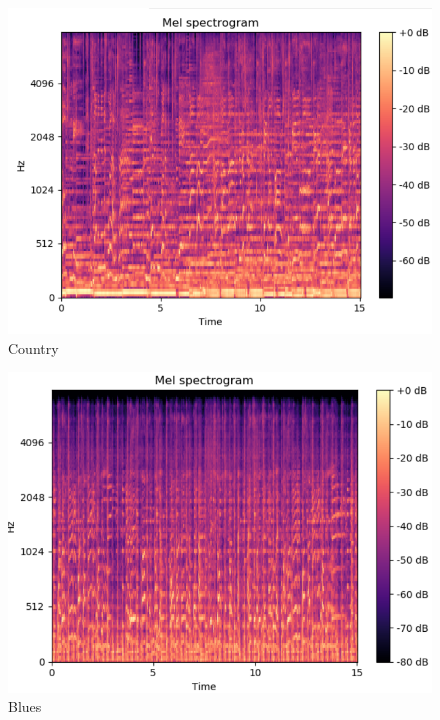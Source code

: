 \begin{figure}
\begin{center}
\includegraphics[scale=0.2]{./figures/country.png}
\end{center}
\caption
{
Country
}
\label{fig:big_picture4}
\end{figure}

\begin{figure}
\begin{center}
\includegraphics[scale=0.2]{./figures/blues.png}
\end{center}
\caption
{
Blues
}
\label{fig:big_picture5}
\end{figure}


